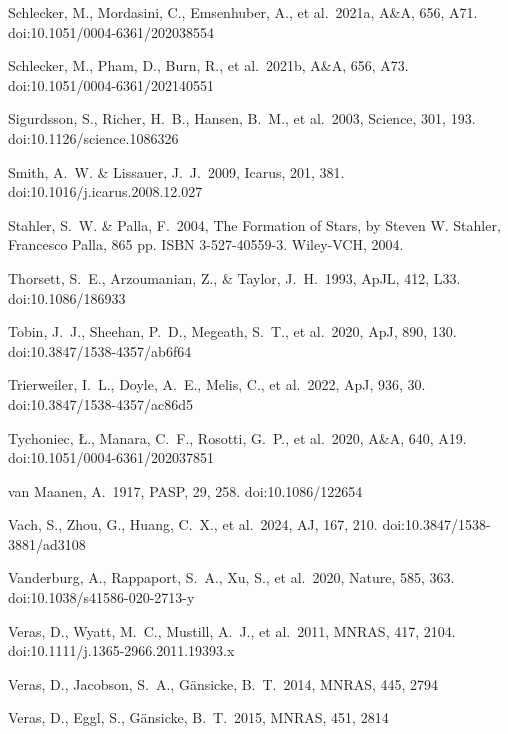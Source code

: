 \documentclass[useAMS,usenatbib]{mn2e}
\begin{document}
\begin{thebibliography}{99}
 Schlecker, M., Mordasini, C., Emsenhuber, A., et al.\ 2021a, A\&A, 656, A71. doi:10.1051/0004-6361/202038554

 Schlecker, M., Pham, D., Burn, R., et al.\ 2021b, A\&A, 656, A73. doi:10.1051/0004-6361/202140551

 Sigurdsson, S., Richer, H.~B., Hansen, B.~M., et al.\ 2003, Science, 301, 193. doi:10.1126/science.1086326

 Smith, A.~W. \& Lissauer, J.~J.\ 2009, Icarus, 201, 381. doi:10.1016/j.icarus.2008.12.027

 Stahler, S.~W. \& Palla, F.\ 2004, The Formation of Stars, by Steven W. Stahler, Francesco Palla, 865 pp. ISBN 3-527-40559-3. Wiley-VCH, 2004.

 Thorsett, S.~E., Arzoumanian, Z., \& Taylor, J.~H.\ 1993, ApJL, 412, L33. doi:10.1086/186933

 Tobin, J.~J., Sheehan, P.~D., Megeath, S.~T., et al.\ 2020, ApJ, 890, 130. doi:10.3847/1538-4357/ab6f64

 Trierweiler, I.~L., Doyle, A.~E., Melis, C., et al.\ 2022, ApJ, 936, 30. doi:10.3847/1538-4357/ac86d5

 Tychoniec, {\L}., Manara, C.~F., Rosotti, G.~P., et al.\ 2020, A\&A, 640, A19. doi:10.1051/0004-6361/202037851

 van Maanen, A.\ 1917, PASP, 29, 258. doi:10.1086/122654

 Vach, S., Zhou, G., Huang, C.~X., et al.\ 2024, AJ, 167, 210. doi:10.3847/1538-3881/ad3108

 Vanderburg, A., Rappaport, S.~A., Xu, S., et al.\ 2020, Nature, 585, 363. doi:10.1038/s41586-020-2713-y

 Veras, D., Wyatt, M.~C., Mustill, A.~J., et al.\ 2011, MNRAS, 417, 2104. doi:10.1111/j.1365-2966.2011.19393.x

 Veras, D., Jacobson, S.~A., G\"{a}nsicke, B.~T.\ 2014, MNRAS, 445, 2794 

 Veras, D., Eggl, S., G{\"a}nsicke, B.~T.\ 2015, MNRAS, 451, 2814 


\end{thebibliography}
\end{document}
